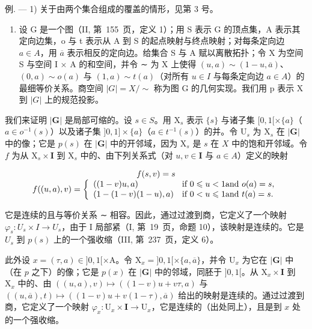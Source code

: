 例. --- 1) 关于由两个集合组成的覆盖的情形，见第 3 号。

\begin{enumerate}
\def\labelenumi{\arabic{enumi})}
\setcounter{enumi}{1}
\tightlist
\item
  设 G 是一个图（II, 第~155~页，定义 1）；用 S 表示 G 的顶点集，A 表示其定向边集，o 与 t 表示从 A 到 S 的起点映射与终点映射；对每条定向边 \(a \in A\)，用 \(\overline{a}\) 表示相反的定向边。给集合 S 与 A 赋以离散拓扑；令 X 为空间 S 与空间 I × A 的和空间，并令 ∼ 为 X 上使得 \((u, a) \sim (1 - u, \overline{a})\)、\((0, a) \sim o(a)\) 与 \((1, a) \sim t(a)\)（对所有 \(u \in I\) 与每条定向边 \(a \in A\)）的最细等价关系。商空间 \(|G| = X / \sim\) 称为图 G 的几何实现。我们用 p 表示 X 到 \(|G|\) 上的规范投影。
\end{enumerate}

我们来证明 \(|\mathbf{G}|\) 是局部可缩的。设 \(s \in S\)。用 \(\mathrm{X}_s\) 表示 \(\{s\}\) 与诸子集 \([0,1[ \times \{a\}\)（\(a \in o^{-1}(s)\)）以及诸子集 \(]0,1] \times \{a\}\)（\(a \in t^{-1}(s)\)）的并。令 \(\mathrm{U}_s\) 为 \(\mathrm{X}_s\) 在 \(|\mathbf{G}|\) 中的像；它是 \(p(s)\) 在 \(|\mathbf{G}|\) 中的开邻域，因为 \(\mathrm{X}_s\) 是 \(s\) 在 \(X\) 中的饱和开邻域。令 \(f\) 为从 \(\mathrm{X}_s \times \mathbf{I}\) 到 \(\mathrm{X}_s\) 中的、由下列关系式（对 \(u, v \in \mathbf{I}\) 与 \(a \in A\)）定义的映射

\[
\begin{array}{c} f (s, v) = s \\ f ((u, a), v) = \left\{ \begin{array}{l l} ((1 - v) u, a) & \text {if } 0 \leqslant u <   1 \text {and } o (a) = s, \\ (1 - (1 - v) (1 - u), a) & \text {if } 0 <   u \leqslant 1 \text {and } t (a) = s. \end{array} \right. \end{array}
\]

它是连续的且与等价关系 ∼ 相容。因此，通过过渡到商，它定义了一个映射 \(\varphi_{s}\colon U_{s}\times I\to U_{s}\)，由于 I 局部紧（I, 第~19~页，命题 10），该映射是连续的。它是 \(U_{s}\) 到 \(p(s)\) 上的一个强收缩（III, 第~237~页，定义 6）。

此外设 \(x = (\tau, a) \in ]0, 1[ \times \mathrm{A}\)。令 \(\mathrm{X}_x = ]0, 1[ \times \{a, \overline{a}\}\)，并令 \(\mathrm{U}_x\) 为它在 \(|\mathbf{G}|\) 中（在 \(p\) 之下）的像；它是 \(p(x)\) 在 \(|\mathbf{G}|\) 中的邻域，同胚于 \(]0, 1[\)。从 \(\mathrm{X}_x \times \mathbf{I}\) 到 \(\mathrm{X}_x\) 中的、由 \(((u, a), v) \mapsto ((1 - v)u + v\tau, a)\) 与 \(((u, \overline{a}), t) \mapsto ((1 - v)u + v(1 - \tau), \overline{a})\) 给出的映射是连续的。通过过渡到商，它定义了一个映射 \(\varphi_x: \mathrm{U}_x \times \mathbf{I} \to \mathrm{U}_x\)，它是连续的（出处同上），且是到 \(x\) 处的一个强收缩。

